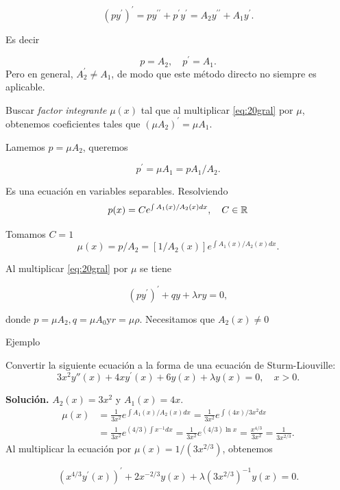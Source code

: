 $$\left(p y^{\prime}\right)^{\prime}=p y^{\prime \prime}+p^{\prime} y^{\prime}=A_{2} y^{\prime \prime}+A_{1}y^{\prime}.$$

Es decir 

$$p=A_{2},\quad p^{\prime}=A_{1}.$$
Pero en general, $A_{2}^{\prime} \neq A_{1}$, de modo que este método directo no siempre es aplicable.


 



 
 Buscar
 \emph{factor integrante} $\mu(x)$ tal que al multiplicar \eqref{eq:20gral} por $\mu$,  obtenemos coeficientes tales que  $\left(\mu A_{2}\right)^{\prime}=\mu A_{1}$. 
 
 
 Lamemos $p=\mu A_{2}$,  queremos 
 
 $$p^{\prime}=\mu A_{1}=p A_{1} / A_{2}.$$
 
 Es una ecuación en variables separables. Resolviendo
$$
p(x)=C e^{\int A_{1}(x) / A_{2}( x) d x},\quad C\in\mathbb{R}
$$

Tomamos $C=1$ 
$$\mu(x)=p / A_{2}=\left[1 / A_{2}(x)\right] e^{\int A_{1}(x) / A_{2}(x) d x}.$$

Al multiplicar \eqref{eq:20gral} por  $\mu$ se tiene

$$\left(p y^{\prime}\right)^{\prime}+q y+\lambda r y=0,$$

donde $p=\mu A_{2}, q=\mu A_{0} \mathrm{y} r=\mu \rho$. Necesitamos  que $A_{2}(x)\neq 0$



 



 

{Ejemplo}
 
 Convertir la siguiente ecuación a la forma de una ecuación de Sturm-Liouville:
$$
 3 x^{2} y''(x)+4 x y^{\prime}(x)+6 y(x)+\lambda y(x)=0, \quad x>0.
$$


\textbf{Solución.}  $A_{2}(x)=3 x^{2}$ y $A_{1}(x)=4 x$.
$$
\begin{aligned}
\mu(x) &=\frac{1}{3 x^{2}} e^{\int A_1(x) / A_2(x) d x}=\frac{1}{3 x^{2}} e^{\int(4 x)/3 x^{2} d x} \\
&=\frac{1}{3 x^{2}} e^{(4 / 3) \int x^{-1} d x}=\frac{1}{3 x^{2}} e^{(4 / 3) \ln x}=\frac{x^{4 / 3}}{3 x^{2}}=\frac{1}{3 x^{2 / 3}} .
\end{aligned}
$$
Al multiplicar la ecuación por $\mu(x)=1 /\left(3 x^{2 / 3}\right)$, obtenemos

$$\left(x^{4 / 3} y^{\prime}(x)\right)^{\prime}+2 x^{-2 / 3} y(x)+\lambda\left(3 x^{2 / 3}\right)^{-1} y(x)=0.$$



